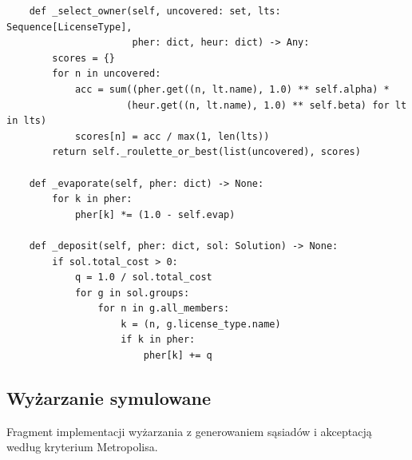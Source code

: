 {\begin{verbatim}
    def _select_owner(self, uncovered: set, lts: Sequence[LicenseType],
                      pher: dict, heur: dict) -> Any:
        scores = {}
        for n in uncovered:
            acc = sum((pher.get((n, lt.name), 1.0) ** self.alpha) *
                     (heur.get((n, lt.name), 1.0) ** self.beta) for lt in lts)
            scores[n] = acc / max(1, len(lts))
        return self._roulette_or_best(list(uncovered), scores)

    def _evaporate(self, pher: dict) -> None:
        for k in pher:
            pher[k] *= (1.0 - self.evap)

    def _deposit(self, pher: dict, sol: Solution) -> None:
        if sol.total_cost > 0:
            q = 1.0 / sol.total_cost
            for g in sol.groups:
                for n in g.all_members:
                    k = (n, g.license_type.name)
                    if k in pher:
                        pher[k] += q
\end{verbatim}
    }

\subsection{Wyżarzanie symulowane}
Fragment implementacji wyżarzania z generowaniem sąsiadów
i akceptacją według kryterium Metropolisa.

